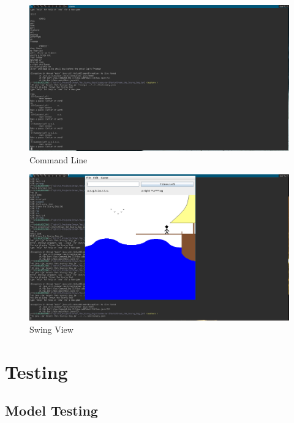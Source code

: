 \documentclass[a4paper, 11pt]{article}
\begin{document}
\begin{landscape}

\begin{figure}[H]
\centering
\includegraphics[scale=0.5]{./res/CliView.png}
\caption{Command Line}
\label{CliViewFinished}
\end{figure}

\begin{figure}[H]
\centering
\includegraphics[scale=0.5]{./res/SwingView.png}
\caption{Swing View}
\label{SwingViewFinished}
\end{figure}

\section{Testing}

\subsection{Model Testing}


\end{landscape}
\end{document}
